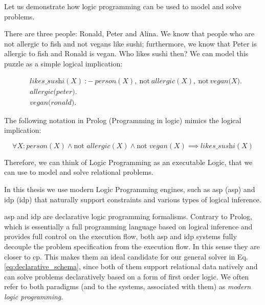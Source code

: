 Let us demonstrate how logic programming can be used to model and solve problems. 
\begin{example}
There are three people: Ronald, Peter and
Alina. We know that people who are not allergic to fish and not vegans like sushi; 
furthermore, we know that Peter is allergic to fish and Ronald is
    vegan. 
Who likes sushi then? We can model this puzzle as a
simple logical implication:

\begin{equation*}
    \begin{aligned}
& \textit{likes\_sushi}(X)~{:}{-}~\textit{person}(X),~\text{not}~
        \textit{allergic}(X), ~\text{not}~\textit{vegan(X)}. \\
&       \textit{allergic(peter)}. \\
&       \textit{vegan(ronald)}.
    \end{aligned}
\end{equation*}

The following notation in Prolog (Programming in logic)
\parencite{birth_of_prolog} mimics the logical implication:

\begin{equation}\label{eq:sushi}
  \forall X: \textit{person}(X) \wedge \text{not }
    \textit{allergic}(X) \wedge \text{not } \textit{vegan}(X)
  \implies \textit{likes\_sushi}(X)
\end{equation}
\end{example}
Therefore, we can think of Logic Programming as an executable Logic, that
we can use to model and solve relational problems.

In this thesis we use modern Logic Programming engines, such
as \acrlong{asp} (\acrshort{asp}) \parencite{ASPbook,whatisasp} and
\acrlong{idp} (\acrshort{idp})
\parencite{idp} %
that naturally support constraints and various types of logical
inference.

\pubrev
\acrshort{asp} and \acrshort{idp} are declarative logic programming
formalisms. Contrary to Prolog, which is essentially a full
programming language based on logical inference and provides full
control on the execution flow,  both \acrshort{asp} and \acrshort{idp}
systems fully decouple the problem specification from the execution
flow. In this sense they are closer to \acrlong{cp}. This makes them
an ideal candidate for our general solver in Eq. 
\ref{eq:declarative_schema}, since both of them support relational
data natively and can solve problems declaratively based on a form of
first order logic. We often refer to both paradigms (and to the systems,
associated with them) as \textit{modern logic programming}.

